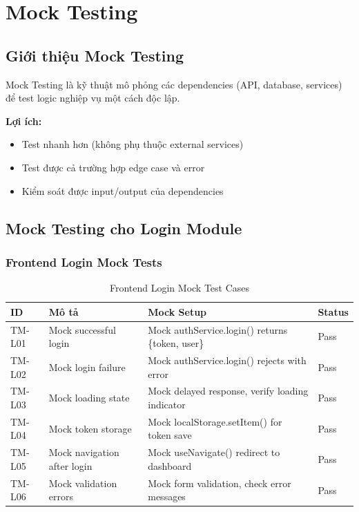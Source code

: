 ﻿\section{Mock Testing}

\subsection{Giới thiệu Mock Testing}
Mock Testing là kỹ thuật mô phỏng các dependencies (API, database, services) để test logic nghiệp vụ một cách độc lập.

\textbf{Lợi ích:}
\begin{itemize}
    \item Test nhanh hơn (không phụ thuộc external services)
    \item Test được cả trường hợp edge case và error
    \item Kiểm soát được input/output của dependencies
\end{itemize}

\subsection{Mock Testing cho Login Module}

\subsubsection{Frontend Login Mock Tests}
\begin{table}[H]
\centering
\small
\begin{tabular}{|p{1cm}|p{4cm}|p{5cm}|p{2cm}|}
\hline
\textbf{ID} & \textbf{Mô tả} & \textbf{Mock Setup} & \textbf{Status} \\
\hline
TM-L01 & Mock successful login & Mock authService.login() returns \{token, user\} & Pass \\
\hline
TM-L02 & Mock login failure & Mock authService.login() rejects with error & Pass \\
\hline
TM-L03 & Mock loading state & Mock delayed response, verify loading indicator & Pass \\
\hline
TM-L04 & Mock token storage & Mock localStorage.setItem() for token save & Pass \\
\hline
TM-L05 & Mock navigation after login & Mock useNavigate() redirect to dashboard & Pass \\
\hline
TM-L06 & Mock validation errors & Mock form validation, check error messages & Pass \\
\hline
\end{tabular}
\caption{Frontend Login Mock Test Cases}
\end{table}

